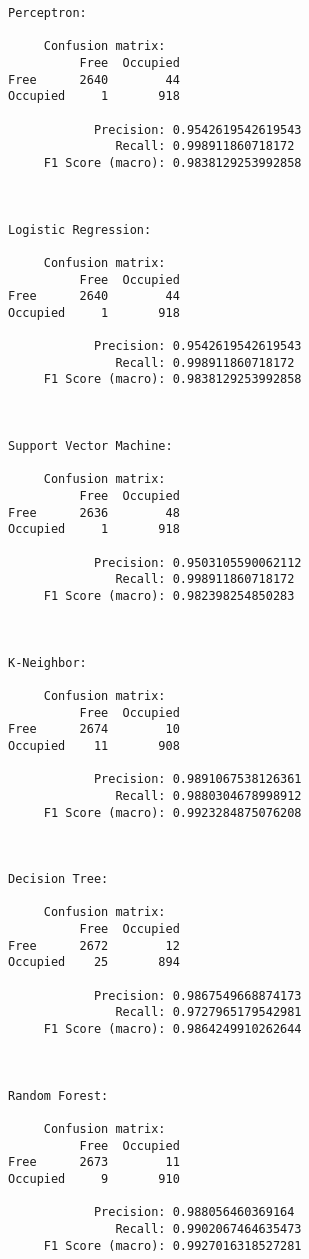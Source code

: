 \documentclass[11pt]{article}
\begin{document}
    \begin{Verbatim}[commandchars=\\\{\}]
Perceptron:

     Confusion matrix:
          Free  Occupied
Free      2640        44
Occupied     1       918

            Precision: 0.9542619542619543
               Recall: 0.998911860718172
     F1 Score (macro): 0.9838129253992858



Logistic Regression:

     Confusion matrix:
          Free  Occupied
Free      2640        44
Occupied     1       918

            Precision: 0.9542619542619543
               Recall: 0.998911860718172
     F1 Score (macro): 0.9838129253992858



Support Vector Machine:

     Confusion matrix:
          Free  Occupied
Free      2636        48
Occupied     1       918

            Precision: 0.9503105590062112
               Recall: 0.998911860718172
     F1 Score (macro): 0.982398254850283



K-Neighbor:

     Confusion matrix:
          Free  Occupied
Free      2674        10
Occupied    11       908

            Precision: 0.9891067538126361
               Recall: 0.9880304678998912
     F1 Score (macro): 0.9923284875076208



Decision Tree:

     Confusion matrix:
          Free  Occupied
Free      2672        12
Occupied    25       894

            Precision: 0.9867549668874173
               Recall: 0.9727965179542981
     F1 Score (macro): 0.9864249910262644



Random Forest:

     Confusion matrix:
          Free  Occupied
Free      2673        11
Occupied     9       910

            Precision: 0.988056460369164
               Recall: 0.9902067464635473
     F1 Score (macro): 0.9927016318527281



\end{Verbatim}
\end{document}
